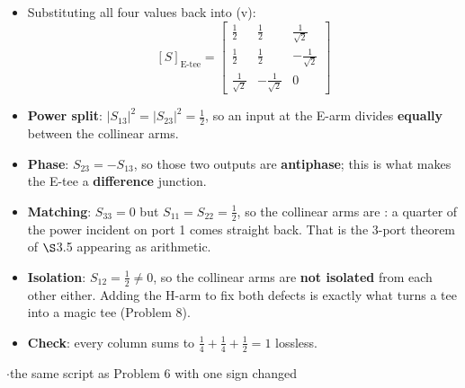\begin{itemize}
  \item Substituting all four values back into (v):
    \[ \boxed{\;[S]_{\text{E-tee}} = \begin{bmatrix}
       \tfrac{1}{2} & \tfrac{1}{2} & \tfrac{1}{\sqrt{2}} \\[3pt]
       \tfrac{1}{2} & \tfrac{1}{2} & -\tfrac{1}{\sqrt{2}} \\[3pt]
       \tfrac{1}{\sqrt{2}} & -\tfrac{1}{\sqrt{2}} & 0 \end{bmatrix}\;} \]
\end{itemize}
\begin{itemize}
  \item \textbf{Power split}: $|S_{13}|^2 = |S_{23}|^2 = \tfrac{1}{2}$, so an input at the
    E-arm divides \textbf{equally} between the collinear arms.
  \item \textbf{Phase}: $S_{23} = -S_{13}$, so those two outputs are \textbf{antiphase};
    this is what makes the E-tee a \textbf{difference} junction.
  \item \textbf{Matching}: $S_{33} = 0$ but $S_{11} = S_{22} = \tfrac{1}{2}$, so the
    collinear arms are : a quarter of the power incident on port 1 comes
    straight back. That is the 3-port theorem of $\S$3.5 appearing as arithmetic.
  \item \textbf{Isolation}: $S_{12} = \tfrac{1}{2} \neq 0$, so the collinear arms are
    \textbf{not isolated} from each other either. Adding the H-arm to fix both defects is
    exactly what turns a tee into a magic tee (Problem 8).
  \item \textbf{Check}: every column sums to
    $\tfrac{1}{4}+\tfrac{1}{4}+\tfrac{1}{2} = 1$ \checkmark lossless.
\end{itemize}

\vspace{2pt}

{\color{sub}\footnotesize {} \gap$\cdot$\gap the same script as Problem 6 with one sign changed}

